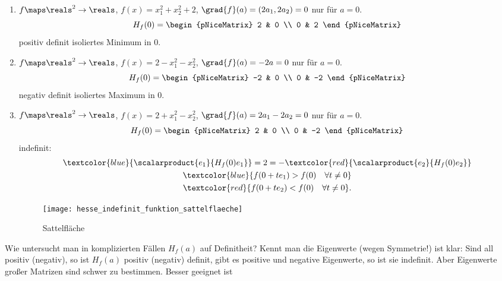\begin{beispiele*}
  \begin{enumerate}
    \item \( f\maps \reals^2\to \reals \), \( f(x)=x_1^2+x_2^2+2 \), \(\grad{f}(a)=(2a_1,2a_2)=0\) nur für \( a=0 \).
    \begin{equation*}
      H_f(0)=\begin{pNiceMatrix} 2 & 0 \\ 0 & 2 \end{pNiceMatrix}
    \end{equation*} positiv definit \timplies isoliertes Minimum in \( 0 \).  
    \item \( f\maps \reals^2\to \reals \), \( f(x)=2-x_1^2-x_2^2 \), \( \grad{f}(a)=-2a=0 \) nur für \( a=0 \). 
    \begin{equation*}
      H_f(0)=\begin{pNiceMatrix} -2 & 0 \\ 0 & -2 \end{pNiceMatrix}
    \end{equation*}
    negativ definit \timplies isoliertes Maximum in \( 0 \).
    \item \( f\maps \reals^2\to \reals \), \( f(x)=2+x_1^2-x_2^2 \), \( \grad{f}(a)=2a_1-2a_2=0 \) nur für \( a=0 \).
    \begin{equation*}
      H_f(0)=\begin{pNiceMatrix} 2 & 0 \\ 0 & -2 \end{pNiceMatrix}
    \end{equation*}
    indefinit:
    \begin{gather*}
      \textcolor{blue}{\scalarproduct{e_1}{H_f(0)e_1}}=2=-\textcolor{red}{\scalarproduct{e_2}{H_f(0)e_2}}\\
      \textcolor{blue}{f(0+te_1)>f(0)\quad \forall t\neq 0}\\
      \textcolor{red}{f(0+te_2)<f(0)\quad \forall t\neq 0}.
    \end{gather*}
    \begin{figure}[H]
      \centering
      \texttt{[image: hesse\_indefinit\_funktion\_sattelflaeche]}
      \caption*{Sattelfläche}
      \label{fig:hesse_indefinit_funktion_sattelflaeche}
    \end{figure}
  \end{enumerate}
\end{beispiele*}
\begin{bemerkung*}
  Wie untersucht man in komplizierten Fällen \( H_f(a) \) auf Definitheit? Kennt man die Eigenwerte (\texists wegen Symmetrie!) ist klar: Sind all positiv (negativ), so ist \( H_f(a) \) positiv (negativ) definit, gibt es positive und negative Eigenwerte, so ist sie indefinit. Aber Eigenwerte großer Matrizen sind schwer zu bestimmen. Besser geeignet ist
\end{bemerkung*}
